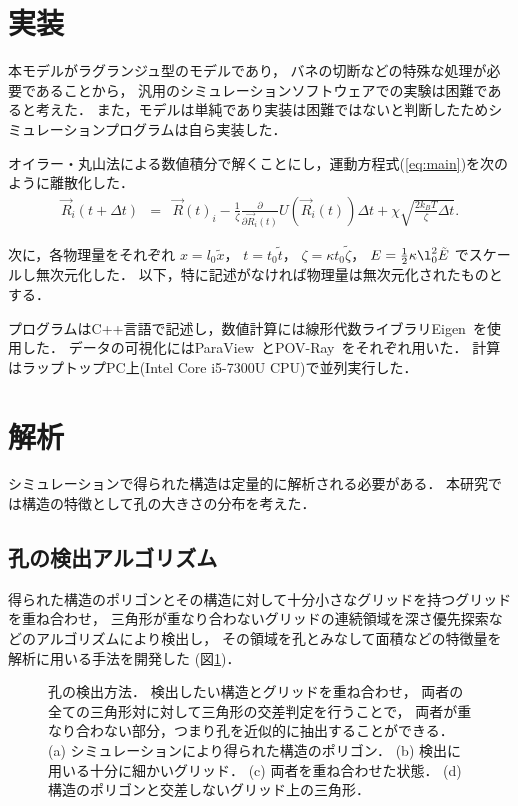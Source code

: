 \section{実装}
本モデルがラグランジュ型のモデルであり，
バネの切断などの特殊な処理が必要であることから，
汎用のシミュレーションソフトウェアでの実験は困難であると考えた．
また，モデルは単純であり実装は困難ではないと判断したためシミュレーションプログラムは自ら実装した．

オイラー・丸山法による数値積分で解くことにし，運動方程式(\ref{eq:main})を次のように離散化した．
\begin{eqnarray}
    \vec{R}_i(t+\Delta t) &=& 
    \vec{R}(t)_i
    -\frac{1}{\zeta}\frac{\partial}{\partial\vec{R}_i(t)}U(\vec{R}_i(t))\Delta t
    +\chi\sqrt{\frac{2k_B T}{\zeta}\Delta t}
    .
\end{eqnarray}

次に，各物理量をそれぞれ
$x=l_0 \tilde{x}$，
$t=t_0 \tilde{t}$，
$\zeta=\kappa t_0 \tilde{\zeta}$，
$E=\frac{1}{2}\kappa\l_0^2\tilde{E}$
でスケールし無次元化した．
以下，特に記述がなければ物理量は無次元化されたものとする．

プログラムはC++言語で記述し，数値計算には線形代数ライブラリEigen~\cite{eigenweb}を使用した．
データの可視化にはParaView~\cite{paraview}とPOV-Ray~\cite{povray}をそれぞれ用いた．
計算はラップトップPC上(Intel Core i5-7300U CPU)で並列実行した．


\section{解析}
シミュレーションで得られた構造は定量的に解析される必要がある．
本研究では構造の特徴として孔の大きさの分布を考えた．


\subsection{孔の検出アルゴリズム}
得られた構造のポリゴンとその構造に対して十分小さなグリッドを持つグリッドを重ね合わせ，
三角形が重なり合わないグリッドの連続領域を深さ優先探索などのアルゴリズムにより検出し，
その領域を孔とみなして面積などの特徴量を解析に用いる手法を開発した
(図\ref{fig:xor})．
\begin{figure}
    \centering
    
    \caption{
        孔の検出方法．
        検出したい構造とグリッドを重ね合わせ，
        両者の全ての三角形対に対して三角形の交差判定を行うことで，
        両者が重なり合わない部分，つまり孔を近似的に抽出することができる．
        (a) シミュレーションにより得られた構造のポリゴン．
        (b) 検出に用いる十分に細かいグリッド．
        (c) 両者を重ね合わせた状態．
        (d) 構造のポリゴンと交差しないグリッド上の三角形．
    }
    \label{fig:xor}
\end{figure}

